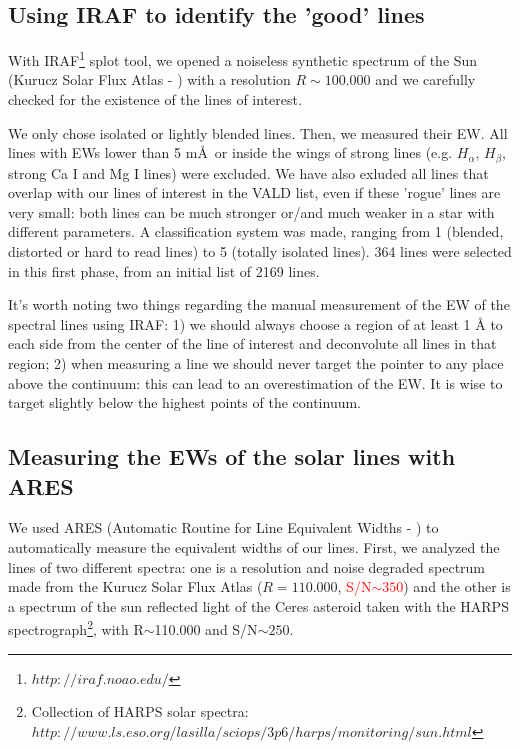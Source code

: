 \documentclass[dvips,12pt,a4paper]{report}
\begin{document}
{\subsection {Using IRAF to identify the 'good' lines}
\label{idiraf}
With IRAF\footnote{$http://iraf.noao.edu/$} splot tool, we opened a noiseless synthetic spectrum of the Sun (Kurucz Solar Flux Atlas - \citet{Kurucz-1984} ) with a resolution $R\sim100.000$ and we carefully checked for the existence of the lines of interest.

We only chose isolated or lightly blended lines. Then, we measured their EW. All lines with EWs lower than 5 m\AA\, or inside the wings of strong lines (e.g. $H_\alpha$, $H_\beta$, strong Ca I and Mg I lines) were excluded. We have also exluded all lines that overlap with our lines of interest in the VALD list, even if these 'rogue' lines are very small: both lines can be much stronger or/and much weaker in a star with different parameters. A classification system was made, ranging from 1 (blended, distorted or hard to read lines) to 5 (totally isolated lines). 364 lines were selected in this first phase, from an initial list of 2169 lines. 

It's worth noting two things regarding the manual measurement of the EW of the spectral lines using IRAF: 1) we should always choose a region of at least 1 \AA{} to each side from the center of the line of interest and deconvolute all lines in that region; 2) when measuring a line we should never target the pointer to any place above the continuum: this can lead to an overestimation of the EW. It is wise to target slightly below the highest points of the continuum.

\subsection {Measuring the EWs of the solar lines with ARES}
\label{ARES}
We used ARES (Automatic Routine for Line Equivalent Widths - \citep{Sousa-2007}) to automatically measure the equivalent widths of our lines. First, we analyzed the lines of two different spectra: one is a resolution and noise degraded spectrum made from the Kurucz Solar Flux Atlas ($R=110.000$, \textcolor{red}{S/N$\sim350$}) and the other is a spectrum of the sun reflected light of the Ceres asteroid taken with the HARPS spectrograph\footnote{Collection of HARPS solar spectra: $http://www.ls.eso.org/lasilla/sciops/3p6/harps/monitoring/sun.html$}, with R$\sim$110.000 and S/N$\sim250$. %



}
\end{document}

